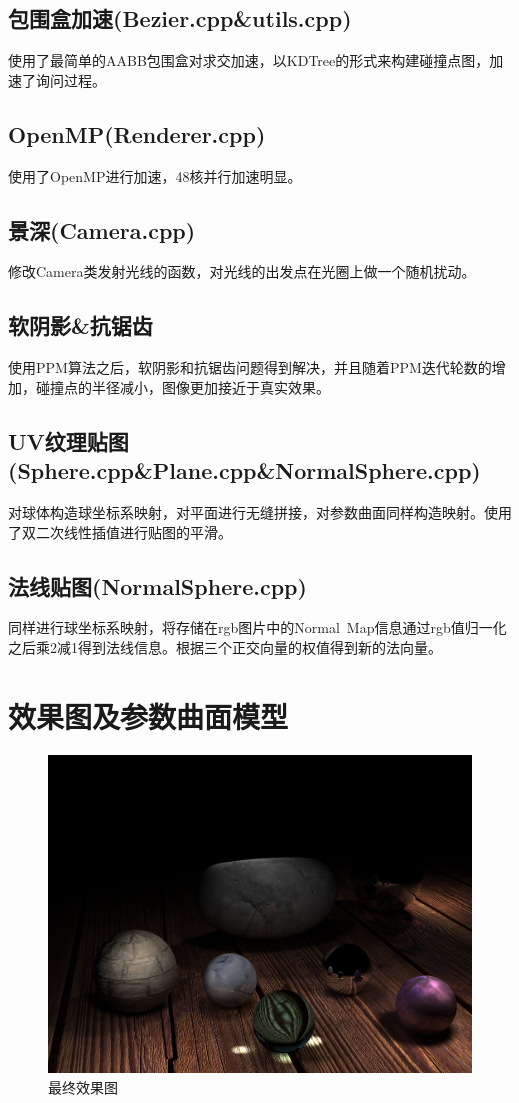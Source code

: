 \documentclass[12pt]{article}
\begin{document}
\subsection{包围盒加速(Bezier.cpp\&utils.cpp)}
使用了最简单的AABB包围盒对求交加速，以KDTree的形式来构建碰撞点图，加速了询问过程。
\subsection{OpenMP(Renderer.cpp)}
使用了OpenMP进行加速，48核并行加速明显。
\subsection{景深(Camera.cpp)}
修改Camera类发射光线的函数，对光线的出发点在光圈上做一个随机扰动。
\subsection{软阴影\&抗锯齿}
使用PPM算法之后，软阴影和抗锯齿问题得到解决，并且随着PPM迭代轮数的增加，碰撞点的半径减小，图像更加接近于真实效果。
\subsection{UV纹理贴图(Sphere.cpp\&Plane.cpp\&NormalSphere.cpp)}
对球体构造球坐标系映射，对平面进行无缝拼接，对参数曲面同样构造映射。使用了双二次线性插值进行贴图的平滑。
\subsection{法线贴图(NormalSphere.cpp)}
同样进行球坐标系映射，将存储在rgb图片中的Normal\ Map信息通过rgb值归一化之后乘2减1得到法线信息。根据三个正交向量的权值得到新的法向量。

\section{效果图及参数曲面模型}

\begin{figure}[h]
\centering
\includegraphics[width=\linewidth]{PPM.jpg}
\caption{最终效果图}
\label{fig:1}
\end{figure}
\end{document}
